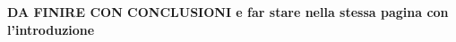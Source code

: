 \documentclass[12pt, openany]{report}
\begin{document}




\setcounter{page}{1}


\textbf{DA FINIRE CON CONCLUSIONI e far stare nella stessa pagina con l'introduzione}




% 
% 



\clearpage

% 


% 



\clearpage

% 
% 
% 
\printbibliography
\renewcommand{\listfigurename}{List of figures}
\listoffigures

\end{document}
